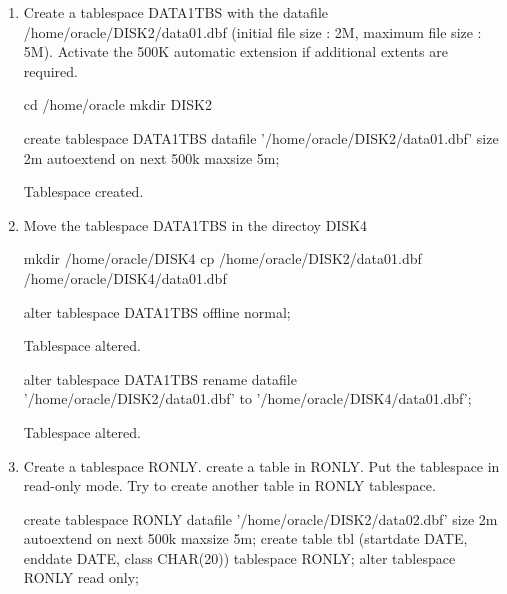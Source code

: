 \documentclass{article}
\begin{document}
\begin{enumerate}
\begin{messageshell}
\end{messageshell}

\item{Create a tablespace DATA1TBS with the datafile /home/oracle/DISK2/data01.dbf (initial file size : 2M, maximum file size : 5M). Activate the 500K automatic extension if additional extents are required.}
\begin{commandshell}
cd /home/oracle 
mkdir DISK2
\end{commandshell}
\begin{sqlshell}
create tablespace DATA1TBS datafile '/home/oracle/DISK2/data01.dbf' size 2m autoextend on next 500k maxsize 5m;
\end{sqlshell}
\begin{messageshell}

Tablespace created.

\end{messageshell}

\item{Move the tablespace DATA1TBS in the directoy DISK4 }
\begin{commandshell}
mkdir /home/oracle/DISK4
cp /home/oracle/DISK2/data01.dbf /home/oracle/DISK4/data01.dbf
\end{commandshell}
\begin{sqlshell}
alter tablespace DATA1TBS offline normal;
\end{sqlshell}
\begin{messageshell}

Tablespace altered.
\end{messageshell}

\begin{sqlshell}
alter tablespace DATA1TBS rename datafile '/home/oracle/DISK2/data01.dbf' to '/home/oracle/DISK4/data01.dbf';
\end{sqlshell}
\begin{messageshell}

Tablespace altered.
\end{messageshell}

\item{Create a tablespace RONLY. create a table in RONLY. Put the tablespace in read-only mode. Try to create another table in RONLY tablespace.}
\begin{sqlshell}
create tablespace RONLY datafile '/home/oracle/DISK2/data02.dbf' size 2m autoextend on next 500k maxsize 5m;
create table tbl (startdate DATE, enddate DATE, class CHAR(20)) tablespace RONLY;
alter tablespace RONLY read only;
\end{sqlshell}
\begin{messageshell}


\end{messageshell}
\end{enumerate}
\end{document}
